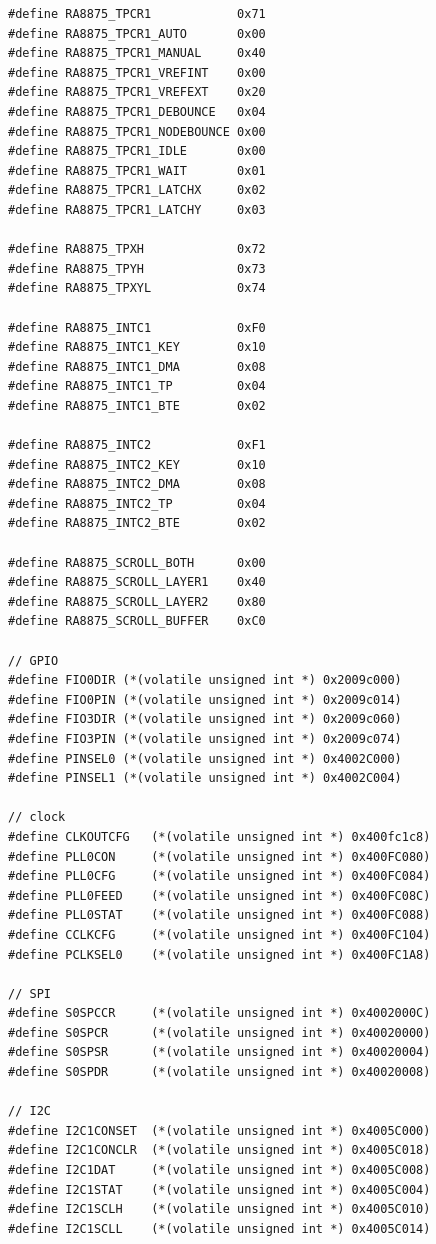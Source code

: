 \documentclass[a4paper, 12pt]{article}
\begin{document}
\begin{verbatim}
#define RA8875_TPCR1            0x71
#define RA8875_TPCR1_AUTO       0x00
#define RA8875_TPCR1_MANUAL     0x40
#define RA8875_TPCR1_VREFINT    0x00
#define RA8875_TPCR1_VREFEXT    0x20
#define RA8875_TPCR1_DEBOUNCE   0x04
#define RA8875_TPCR1_NODEBOUNCE 0x00
#define RA8875_TPCR1_IDLE       0x00
#define RA8875_TPCR1_WAIT       0x01
#define RA8875_TPCR1_LATCHX     0x02
#define RA8875_TPCR1_LATCHY     0x03

#define RA8875_TPXH             0x72
#define RA8875_TPYH             0x73
#define RA8875_TPXYL            0x74

#define RA8875_INTC1            0xF0
#define RA8875_INTC1_KEY        0x10
#define RA8875_INTC1_DMA        0x08
#define RA8875_INTC1_TP         0x04
#define RA8875_INTC1_BTE        0x02

#define RA8875_INTC2            0xF1
#define RA8875_INTC2_KEY        0x10
#define RA8875_INTC2_DMA        0x08
#define RA8875_INTC2_TP         0x04
#define RA8875_INTC2_BTE        0x02

#define RA8875_SCROLL_BOTH      0x00
#define RA8875_SCROLL_LAYER1    0x40
#define RA8875_SCROLL_LAYER2    0x80
#define RA8875_SCROLL_BUFFER    0xC0

// GPIO
#define FIO0DIR (*(volatile unsigned int *) 0x2009c000)
#define FIO0PIN (*(volatile unsigned int *) 0x2009c014)
#define FIO3DIR (*(volatile unsigned int *) 0x2009c060)
#define FIO3PIN (*(volatile unsigned int *) 0x2009c074)
#define PINSEL0 (*(volatile unsigned int *) 0x4002C000)
#define PINSEL1 (*(volatile unsigned int *) 0x4002C004)

// clock
#define CLKOUTCFG   (*(volatile unsigned int *) 0x400fc1c8)
#define PLL0CON     (*(volatile unsigned int *) 0x400FC080)
#define PLL0CFG     (*(volatile unsigned int *) 0x400FC084)
#define PLL0FEED    (*(volatile unsigned int *) 0x400FC08C)
#define PLL0STAT    (*(volatile unsigned int *) 0x400FC088)
#define CCLKCFG     (*(volatile unsigned int *) 0x400FC104)
#define PCLKSEL0 	(*(volatile unsigned int *) 0x400FC1A8)

// SPI
#define S0SPCCR		(*(volatile unsigned int *) 0x4002000C)
#define S0SPCR 		(*(volatile unsigned int *) 0x40020000)
#define S0SPSR 		(*(volatile unsigned int *) 0x40020004)
#define S0SPDR		(*(volatile unsigned int *) 0x40020008)

// I2C
#define I2C1CONSET 	(*(volatile unsigned int *) 0x4005C000)
#define I2C1CONCLR 	(*(volatile unsigned int *) 0x4005C018)
#define I2C1DAT 	(*(volatile unsigned int *) 0x4005C008)
#define I2C1STAT 	(*(volatile unsigned int *) 0x4005C004)
#define I2C1SCLH 	(*(volatile unsigned int *) 0x4005C010)
#define I2C1SCLL 	(*(volatile unsigned int *) 0x4005C014)


\end{verbatim}
\end{document}

